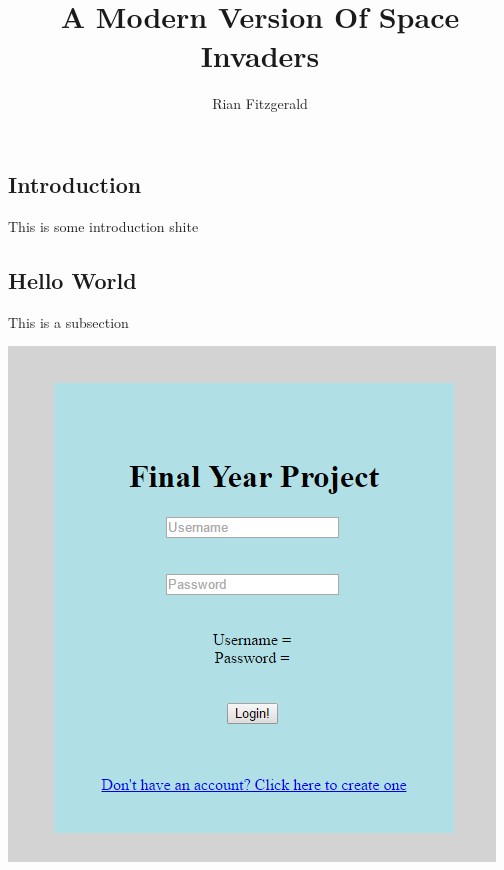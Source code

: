 \documentclass[12pt]{article}
\title{A Modern Version Of Space Invaders}
\author{Rian Fitzgerald}
\begin{document}
\maketitle
\newpage
{}
\tableofcontents



\begin{center}
\section{Introduction}
This is some introduction shite
\end{center}

\subsection{Hello World}


This is a subsection

\begin{center}
\includegraphics[scale=0.5]{photo.png}
\end{center}
\end{document}
